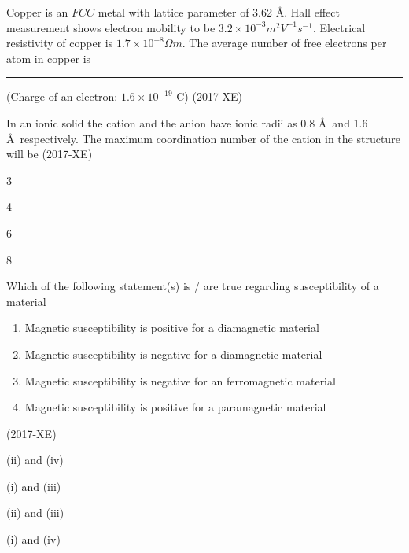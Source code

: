 \iffalse
\title{2017-XE-53-65}
\author{EE24BTECH11010 - BALAJI B}
\section{xe}
\chapter{2017}
\fi

    \item Copper is an $FCC$ metal with lattice parameter of 3.62 \AA . Hall effect measurement shows electron mobility to be $3.2 \times 10^{-3} {m}^2 {V}^{-1}{s}^{-1}$. Electrical resistivity of copper is $1.7 \times 10^{-8}  \Omega {m}$. The average number of free electrons per atom in copper is \rule{2.5cm}{0.5pt}(Charge of an electron: $1.6 \times 10^{-19}$ C) \hfill(2017-XE)
    \item In an ionic solid the cation and the anion have ionic radii as 0.8 \AA \ and 1.6 \AA \ respectively. The maximum coordination number of the cation in the structure will be \hfill(2017-XE)
 \begin{enumerate}
     \begin{multicols}{4}
         \item 3
         \item 4
         \item 6
         \item 8
     \end{multicols}
 \end{enumerate}
\item Which of the following statement(s) is / are true regarding susceptibility of a material
\begin{enumerate}[label=\roman*.]
    \item  Magnetic susceptibility is positive for a diamagnetic material 
    \item  Magnetic susceptibility is negative for a diamagnetic material 
    \item  Magnetic susceptibility is negative for an ferromagnetic material 
    \item Magnetic susceptibility is positive for a paramagnetic material
\end{enumerate}
\hfill(2017-XE)
\begin{enumerate}
    \begin{multicols}{4}
        \item (ii) and (iv)\\
        \item (i) and (iii)\\
        \item (ii) and (iii)\\
        \item (i) and (iv)
    \end{multicols}
\end{enumerate}
